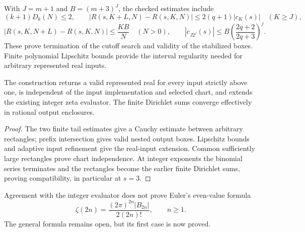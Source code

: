 With $J=m+1$ and $B=(m+3)^J$, the checked estimates include
\[
 (k+1)D_k(N)\le2,\qquad
 |R(s,K+L,N)-R(s,K,N)|\le2(q+1)|c_K(s)|\quad(K\ge J),
\]
\[
 |R(s,K,N+L)-R(s,K,N)|\le\frac{KB}{N}\quad(N>0),\qquad
 |c_{J2^j}(s)|\le B\left(\frac{2q+2}{2q+3}\right)^j.
\]
These prove termination of the cutoff search and validity of the stabilized
boxes. Finite polynomial Lipschitz bounds provide the interval regularity
needed for arbitrary represented real inputs.

\begin{theorem}
\label{thm:zeta-real-computation}
\leanok
The construction returns a valid represented real for every input strictly
above one, is independent of the input implementation and selected chart,
and extends the existing integer zeta evaluator. The finite Dirichlet sums
converge effectively in rational output enclosures.
\end{theorem}
\begin{proof}
The two finite tail estimates give a Cauchy estimate between arbitrary
rectangles; prefix intersection gives valid nested output boxes. Lipschitz
bounds and adaptive input refinement give the real-input extension. Common
sufficiently large rectangles prove chart independence. At integer exponents
the binomial series terminates and the rectangles become the earlier finite
Dirichlet sums, proving compatibility, in particular at $s=3$.
\end{proof}

Agreement with the integer evaluator does not prove Euler's even-value formula
\[
 \zeta(2n)=\frac{(2\pi)^{2n}|B_{2n}|}{2(2n)!},\qquad n\ge1.
\]
The general formula remains open, but its first case is now proved.

